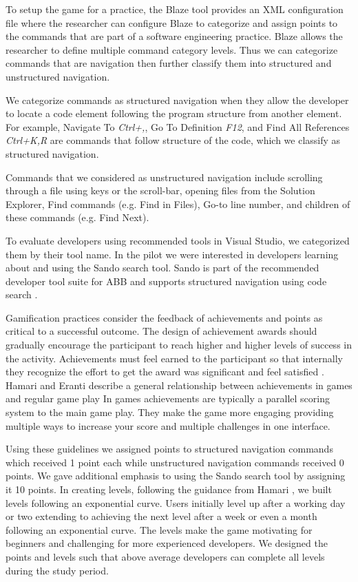 \documentclass{sig-alternate}
\begin{document}
To setup the game for a practice, the Blaze tool provides an XML configuration file where the researcher can configure Blaze to categorize and assign points to the commands that are part of a software engineering practice.  Blaze allows the researcher to define multiple command category levels.  Thus we can categorize commands that are navigation then further classify them into structured and unstructured navigation.  

We categorize commands as structured navigation when they allow the developer to locate a code element following the program structure from another element.  For example, Navigate To \textit{Ctrl+,}, Go To Definition \textit{F12}, and Find All References \textit{Ctrl+K,R} are commands that follow structure of the code, which we classify as structured navigation.

Commands that we considered as unstructured navigation include scrolling through a file using keys or the scroll-bar, opening files from the Solution Explorer, Find commands (e.g. Find in Files), Go-to line number, and children of these commands (e.g. Find Next).

To evaluate developers using recommended tools in Visual Studio, we categorized them by their tool name.  In the pilot we were interested in developers learning about and using the Sando search tool.  Sando is part of the recommended developer tool suite for ABB and supports structured navigation using code search \cite{Shepherd2012Sando}.

Gamification practices consider the feedback of achievements and points as critical to a successful outcome.  The design of achievement awards should gradually encourage the participant to reach higher and higher levels of success in the activity.  Achievements must feel earned to the participant so that internally they recognize the effort to get the award was significant and feel satisfied  \cite{wbsnipes:Hamari2011Framework}.  Hamari and Eranti describe a general relationship between achievements in games and regular game play      In games achievements are typically a parallel scoring system to the main game play.  They make the game more engaging providing multiple ways to increase your score and multiple challenges in one interface.

Using these guidelines we assigned points to structured navigation commands which received 1 point each while unstructured navigation commands received 0 points.    We gave additional emphasis to using the Sando search tool by assigning it 10 points.  In creating levels, following the guidance from Hamari \cite{wbsnipes:Hamari2011Framework}, we built levels following an exponential curve.  Users initially level up after a working day or two extending to achieving the next level after a week or even a month following an exponential curve.  The levels make the game motivating for beginners and challenging for more experienced developers.  We designed the points and levels such that above average developers can complete all levels during the study period.
\end{document}
